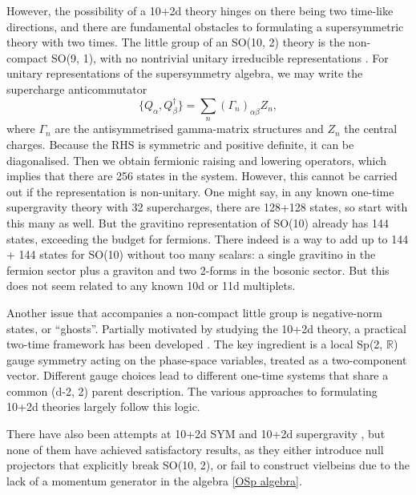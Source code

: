 However, the possibility of a 10+2d theory hinges on there being two time-like directions, and there are fundamental obstacles to formulating a supersymmetric theory with two times.
The little group of an SO(10, 2) theory is the non-compact SO(9, 1), with no nontrivial unitary irreducible representations \cite{Weinberg:1995mt}.
For unitary representations of the supersymmetry algebra, we may write the supercharge anticommutator 
\begin{equation}
\{Q_\alpha,Q_\beta^\dagger\}=\sum_n(\Gamma_n)_{\alpha\beta} Z_n,
\end{equation}
where $\Gamma_n$ are the antisymmetrised gamma-matrix structures and $Z_n$ the central charges. 
Because the RHS is symmetric and positive definite, it can be diagonalised.
Then we obtain fermionic raising and lowering operators, which implies that there are 256 states in the system. 
However, this cannot be carried out if the representation is non-unitary.
One might say, in any known one-time supergravity theory with 32 supercharges, there are 128+128 states, so start with this many as well. 
But the gravitino representation of SO(10) already has 144 states, exceeding the budget for fermions. There indeed is a way to add up to 144 + 144 states for SO(10) without too many scalars: a single gravitino in the fermion sector plus a graviton and two 2-forms in the bosonic sector. 
But this does not seem related to any known 10d or 11d multiplets.

Another issue that accompanies a non-compact little group is negative-norm states, or ``ghosts''.
Partially motivated by studying the 10+2d theory, a practical two-time framework has been developed \cite{Bars:1998cs,Bars:1998ui,Bars:1999nk,Bars:1999uq,Bars:2000qm}. 
The key ingredient is a local Sp(2, $\mathbb{R}$) gauge symmetry acting on the phase-space variables, treated as a two-component vector.
Different gauge choices lead to different one-time systems that share a common (d-2, 2) parent description.
The various approaches to formulating 10+2d theories largely follow this logic.

There have also been attempts at 10+2d SYM \cite{Nishino:1996wp,Sezgin:1997gr,Nishino:1997hk,Nishino:1997ia,Nishino:1999ck} and 10+2d supergravity \cite{Nishino:1997gq,Nishino:1997sw,Nishino:1998qn}, but none of them have achieved satisfactory results, as they either introduce null projectors that explicitly break SO(10, 2),
or fail to construct vielbeins due to the lack of a momentum generator \cite{Hewson:1999tf} in the algebra \eqref{OSp algebra}. 

